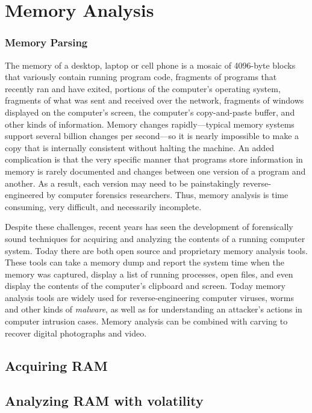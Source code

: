 \chapter{Memory Analysis}\label{ch:ram}
\subsection{Memory Parsing}

The memory of a desktop, laptop or cell phone is a mosaic of 4096-byte
blocks that variously 
contain running program code,  fragments of programs
that recently ran and have exited, portions of the computer's
operating system, fragments of what was sent and received over the
network, fragments of windows displayed on the computer's screen, the
computer's copy-and-paste buffer, and other kinds of information. Memory
changes rapidly---typical memory systems support several billion
changes per second---so it is nearly impossible to make a copy that is
internally consistent without halting the machine. An added complication is that the very
specific manner that programs store information in memory is rarely
documented and changes between one version of a program and
another. As a result, each version may need to be painstakingly reverse-engineered by
computer forensics researchers. Thus, memory analysis is time consuming, very
difficult, and necessarily incomplete.

Despite these challenges, recent years has seen the development of
forensically sound techniques for acquiring and analyzing the contents
of a running computer system. Today there are both open source and
proprietary memory analysis tools. These tools can take a memory dump
and report the system time when the memory was captured, display a
list of running processes, open files, and even display the contents
of the computer's clipboard and screen. Today memory analysis tools
are widely used for reverse-engineering computer viruses, worms and
other kinds of \emph{malware}, as well as for understanding an
attacker's actions in computer intrusion cases. Memory analysis can be combined
with carving to recover digital photographs and video.



\section{Acquiring RAM}
\section{Analyzing RAM with volatility}
